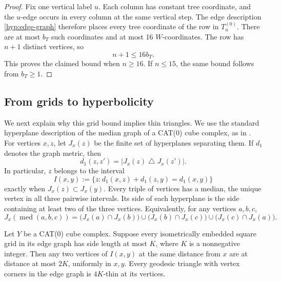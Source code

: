 \begin{proof}
Fix one vertical label \(u\).  Each column has constant tree
coordinate, and the \(u\)-edge occurs in every column at the same
vertical step.  The edge description \eqref{hyp:edge-graph} therefore
places every tree coordinate of the row in \(T_u^{(0)}\).  There are
at most \(b_T\) such coordinates and at most 16 \(W\)-coordinates.
The row has \(n+1\) distinct vertices, so
\[
n+1\leq16b_T.
\]
This proves the claimed bound when \(n\geq16\).  If \(n\leq15\), the
same bound follows from \(b_T\geq1\).
\end{proof}

\subsection{From grids to hyperbolicity}

We next explain why this grid bound implies thin triangles.  We use
the standard hyperplane description of the median graph of a CAT(0)
cube complex, as in
\cite[Theorem~6.1, Lemmas~6.3--6.4, and the paragraph following
Lemma~6.4]{Chepoi}.
For vertices \(x,z\), let \(J_x(z)\) be the finite set of hyperplanes
separating them.  If \(d_1\) denotes the graph metric, then
\begin{equation}
d_1(z,z')=|J_x(z)\mathbin{\triangle}J_x(z')|.
\label{hyp:hyperplane-distance}
\end{equation}
In particular, \(z\) belongs to the interval
\[
I(x,y):=\{z:d_1(x,z)+d_1(z,y)=d_1(x,y)\}
\]
exactly when \(J_x(z)\subset J_x(y)\).  Every triple of vertices has
a median, the unique vertex in all three pairwise intervals.  Its
side of each hyperplane is the side containing at least two of the
three vertices.  Equivalently, for any vertices \(a,b,c\),
\begin{equation}
J_x(\operatorname{med}(a,b,c))
 =\bigl(J_x(a)\cap J_x(b)\bigr)
  \cup\bigl(J_x(b)\cap J_x(c)\bigr)
  \cup\bigl(J_x(c)\cap J_x(a)\bigr).
\label{hyp:median-sides}
\end{equation}

\begin{lemma}
\label{hyp:grids-to-triangles}
Let \(Y\) be a CAT(0) cube complex.  Suppose every isometrically
embedded square grid in its edge graph has side length at most
\(K\), where \(K\) is a nonnegative integer.  Then any two vertices
of \(I(x,y)\) at the same distance from \(x\) are at distance at most
\(2K\), uniformly in \(x,y\).  Every geodesic triangle with vertex
corners in the edge graph is \(4K\)-thin at its vertices.
\end{lemma}

